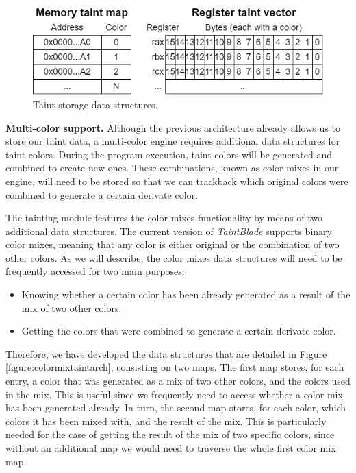 \documentclass[conference]{IEEEtran}
\begin{document}
\begin{figure}
    \centerline{\includegraphics[width=0.9\columnwidth]{images/TaintingEngine.drawio.png}}
    \caption{Taint storage data structures.}
    \label{figure:taintingengine}
\end{figure}

\textbf{Multi-color support.} Although the previous architecture already allows
us to store our taint data, a multi-color engine requires additional data structures
for taint colors. During the program execution, taint colors will be generated
and combined to create new ones. These combinations, known as color mixes in
our engine, will need to be stored so that we can trackback which original colors
were combined to generate a certain derivate color.

The tainting module features the color mixes functionality by means of two
additional data structures. The current version of \textit{TaintBlade} supports
binary color mixes, meaning that any color is either original or the
combination of two other colors. As we will describe, the color mixes data
structures will need to be frequently accessed for two main purposes:
\begin{itemize}
    \item Knowing whether a certain color has been already generated as a result of the
          mix of two other colors.
    \item Getting the colors that were combined to generate a certain derivate color.
\end{itemize}

Therefore, we have developed the data structures that are detailed in Figure
\ref{figure:colormixtaintarch}, consisting on two maps. The first map stores,
for each entry, a color that was generated as a mix of two other colors, and
the colors used in the mix. This is useful since we frequently need to access
whether a color mix has been generated already. In turn, the second map stores,
for each color, which colors it has been mixed with, and the result of the mix.
This is particularly needed for the case of getting the result of the mix of
two specific colors, since without an additional map we would need to traverse
the whole first color mix map.
\end{document}
